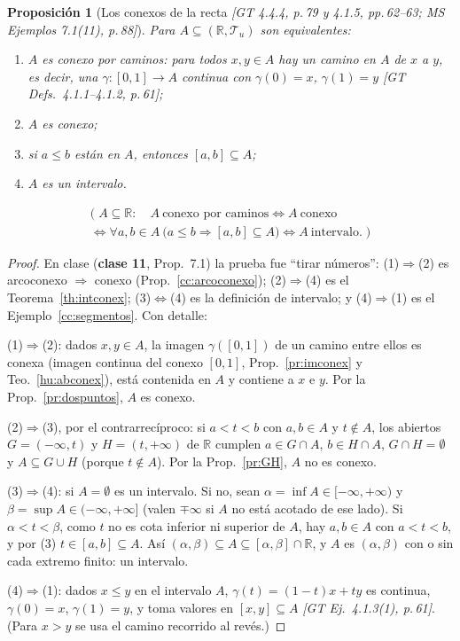 \documentclass[11pt,a4paper]{article}
\newcommand{\lgc}[1]{\par\vspace{-3pt}\begin{gather*}\big(\;#1\;\big)\end{gather*}\vspace{-6pt}}
\theoremstyle{definition}
\theoremstyle{plain}
\newtheorem{proposicion}[definicion]{Proposición}
\newcommand{\fnt}[1]{{\normalfont\small\itshape\color{gray!150!black}[#1]}}
\newcommand{\R}{\mathbb{R}}
\newcommand{\tp}{\mathcal{T}}
\begin{document}
\begin{proposicion}[Los conexos de la recta \fnt{GT 4.4.4, p.\,79 y 4.1.5, pp.\,62--63; MS Ejemplos 7.1(11), p.\,88}]\label{hu:conexR}
Para $A\subseteq(\R,\tp_u)$ son equivalentes:
\begin{enumerate}[label=(\arabic*),leftmargin=2.2em,itemsep=0pt]
\item $A$ es conexo por caminos: para todos $x,y\in A$ hay un \emph{camino} en $A$ de $x$ a $y$, es decir, una $\gamma:[0,1]\to A$ continua con $\gamma(0)=x$, $\gamma(1)=y$ \fnt{GT Defs.\ 4.1.1--4.1.2, p.\,61};
\item $A$ es conexo;
\item si $a\le b$ están en $A$, entonces $[a,b]\subseteq A$;
\item $A$ es un intervalo.
\end{enumerate}
\lgc{A\subseteq\R:\quad A\ \text{conexo por caminos}\iff A\ \text{conexo}\\ \iff \forall a,b\in A\ \big(a\le b\Rightarrow[a,b]\subseteq A\big)\iff A\ \text{intervalo}.}
\end{proposicion}

\begin{proof}
En clase (\textbf{clase 11}, Prop.\ 7.1) la prueba fue ``tirar números'': (1)$\Rightarrow$(2) es arcoconexo $\Rightarrow$ conexo (Prop.~\ref{cc:arcoconexo}); (2)$\Rightarrow$(4) es el Teorema~\ref{th:intconex}; (3)$\iff$(4) es la definición de intervalo; y (4)$\Rightarrow$(1) es el Ejemplo~\ref{cc:segmentos}. Con detalle:

(1)$\Rightarrow$(2): dados $x,y\in A$, la imagen $\gamma([0,1])$ de un camino entre ellos es conexa (imagen continua del conexo $[0,1]$, Prop.~\ref{pr:imconex} y Teo.~\ref{hu:abconex}), está contenida en $A$ y contiene a $x$ e $y$. Por la Prop.~\ref{pr:dospuntos}, $A$ es conexo.

(2)$\Rightarrow$(3), por el contrarrecíproco: si $a<t<b$ con $a,b\in A$ y $t\notin A$, los abiertos $G=(-\infty,t)$ y $H=(t,+\infty)$ de $\R$ cumplen $a\in G\cap A$, $b\in H\cap A$, $G\cap H=\emptyset$ y $A\subseteq G\cup H$ (porque $t\notin A$). Por la Prop.~\ref{pr:GH}, $A$ no es conexo.

(3)$\Rightarrow$(4): si $A=\emptyset$ es un intervalo. Si no, sean $\alpha=\inf A\in[-\infty,+\infty)$ y $\beta=\sup A\in(-\infty,+\infty]$ (valen $\mp\infty$ si $A$ no está acotado de ese lado). Si $\alpha<t<\beta$, como $t$ no es cota inferior ni superior de $A$, hay $a,b\in A$ con $a<t<b$, y por (3) $t\in[a,b]\subseteq A$. Así $(\alpha,\beta)\subseteq A\subseteq[\alpha,\beta]\cap\R$, y $A$ es $(\alpha,\beta)$ con o sin cada extremo finito: un intervalo.

(4)$\Rightarrow$(1): dados $x\le y$ en el intervalo $A$, $\gamma(t)=(1-t)x+ty$ es continua, $\gamma(0)=x$, $\gamma(1)=y$, y toma valores en $[x,y]\subseteq A$ \fnt{GT Ej.\ 4.1.3(1), p.\,61}. (Para $x>y$ se usa el camino recorrido al revés.)
\end{proof}
\end{document}
